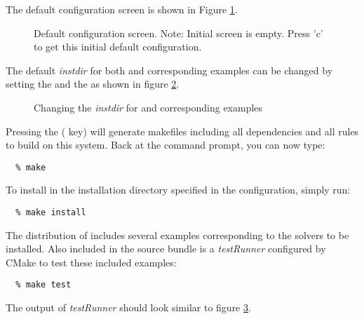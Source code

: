 The default configuration screen is shown in Figure
\ref{f:ccmakedefault}. 
\begin{figure}
{\centerline{}}
\caption [Initial {\em ccmake} configuration screen]
{Default configuration screen. Note: Initial screen is empty.
Press 'c' to get this initial default configuration.}
\label{f:ccmakedefault}
\end{figure}

The default {\em instdir} for both {\sundials} and corresponding examples
can be changed by setting the  and
the  as shown in figure
\ref{f:ccmakeprefix}. 
\begin{figure}
{\centerline{}}
\caption [Changing the {\em instdir}]
{Changing the {\em instdir} for {\sundials} and
corresponding {\id examples} }
\label{f:ccmakeprefix}
\end{figure}

Pressing the ( key) will generate makefiles including all dependencies
and all rules to build {\sundials} on this system. 
Back at the command prompt, you can now type:

\begin{verbatim}
  % make
\end{verbatim}

To install {\sundials} in the installation directory specified in the configuration, simply run:

\begin{verbatim}
  % make install
\end{verbatim}

The distribution of {\sundials} includes several examples corresponding to the solvers to be
installed. Also included in the source bundle is a {\em testRunner} configured by CMake
to test these included examples:

\begin{verbatim}
  % make test
\end{verbatim}

The output of {\em testRunner} should look similar to figure
\ref{f:cmaketest}. 
\begin{figure}
\label{f:cmaketest}
\end{figure}


